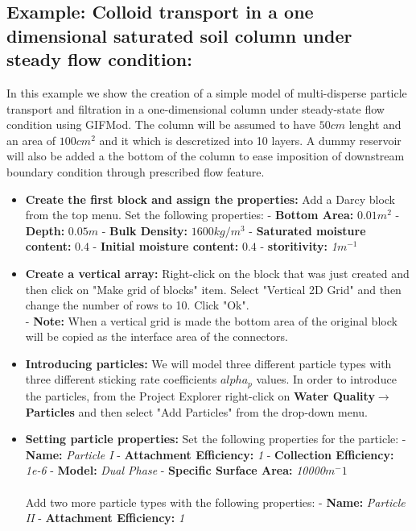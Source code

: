 \subsection{Example: Colloid transport in a one dimensional saturated soil column under steady flow condition: } 
In this example we show the creation of a simple model of multi-disperse particle transport and filtration in a one-dimensional column under steady-state flow condition using GIFMod. The column will be assumed to have $50cm$ lenght and an area of $100cm^2$ and it which is  descretized into 10 layers. A dummy reservoir will also be added a the bottom of the column to ease imposition of downstream boundary condition through prescribed flow feature.   
\begin{itemize}
\item \textbf{Create the first block and assign the properties: } Add a Darcy block from the top menu. Set the following properties: 
- \textbf{Bottom Area: }\textit{$0.01m^2$}
- \textbf{Depth: }\textit{$0.05m$}
- \textbf{Bulk Density: }\textit{$1600 kg/m^3$}
- \textbf{Saturated moisture content: } \textit{$0.4$}
- \textbf{Initial moisture content: } \textit{$0.4$}
- \textbf{storitivity: } \textit{1$m^{-1}$} 
\item \textbf{Create a vertical array: } Right-click on the block that was just created and then click on "Make grid of blocks" item. Select "Vertical 2D Grid" and then change the number of rows to 10. Click "Ok". \\
- \textbf{Note: } When a vertical grid is made the bottom area of the original block will be copied as the interface area of the connectors. 
\item \textbf{Introducing particles: } We will model three different particle types with three different sticking rate coefficients $alpha_p$ values. In order to introduce the particles, from the Project Explorer right-click on \textbf{Water Quality}$\rightarrow$\textbf{Particles} and then select "Add Particles" from the drop-down menu. 
\item \textbf{Setting particle properties: } Set the following properties for the particle: 
- \textbf{Name: } \textit{Particle I} 
- \textbf{Attachment Efficiency: }\textit{1}
- \textbf{Collection Efficiency: } \textit{1e-6}
- \textbf{Model: }\textit{Dual Phase}
- \textbf{Specific Surface Area: }\textit{10000$m^-1$}
\\\\
Add two more particle types with the following properties:
- \textbf{Name: }\textit{Particle II} 
- \textbf{Attachment Efficiency: }\textit{1}

\end{itemize}
